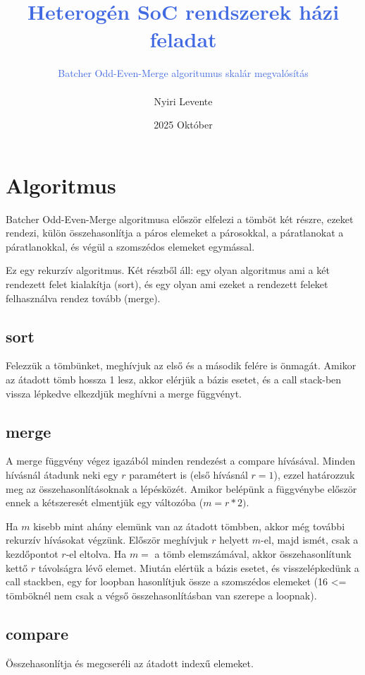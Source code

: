 \documentclass[12pt, letterpaper, a4paper]{article}
\title{\textcolor{RoyalBlue}{\textbf{Heterogén SoC rendszerek házi feladat}}}
\author{\textcolor{RoyalBlue}{Batcher Odd-Even-Merge algoritumus skalár megvalósítás} \\ \\ Nyiri Levente}
\date{2025 Október}
\begin{document}
\maketitle

\newpage

\section{Algoritmus}
Batcher Odd-Even-Merge algoritmusa először elfelezi a tömböt két részre, ezeket rendezi, külön összehasonlítja a páros elemeket a párosokkal, a páratlanokat a páratlanokkal, és végül a szomszédos elemeket egymással.

Ez egy rekurzív algoritmus. Két részből áll: egy olyan algoritmus ami a két rendezett felet kialakítja (sort), és egy olyan ami ezeket a rendezett feleket felhasználva rendez tovább (merge).

\subsection{sort}

Felezzük a tömbünket, meghívjuk az első és a második felére is önmagát. Amikor az átadott tömb hossza 1 lesz, akkor elérjük a bázis esetet, és a call stack-ben vissza lépkedve elkezdjük meghívni a merge függvényt.

\subsection{merge}
A merge függvény végez igazából minden rendezést a compare hívásával. Minden hívásnál átadunk neki egy \(r\) paramétert is (első hívásnál \(r=1\)), ezzel határozzuk meg az összehasonlításoknak a lépésközét. Amikor belépünk a függvénybe először ennek a kétszeresét elmentjük egy változóba (\(m=r*2)\). 

Ha \(m\) kisebb mint ahány elemünk van az átadott tömbben, akkor még további rekurzív hívásokat végzünk. Először meghívjuk \(r\) helyett \(m\)-el, majd ismét, csak a kezdőpontot \(r\)-el eltolva. Ha \(m=\) a tömb elemszámával, akkor összehasonlítunk kettő \(r\) távolságra lévő elemet. Miután elértük a bázis esetet, és visszelépkedünk a call stackben, egy for loopban hasonlítjuk össze a szomszédos elemeket (16 <= tömböknél nem csak a végső összehasonlításban van szerepe a loopnak). 

\subsection{compare}
Összehasonlítja és megcseréli az átadott indexű elemeket.
\newline
\end{document}
